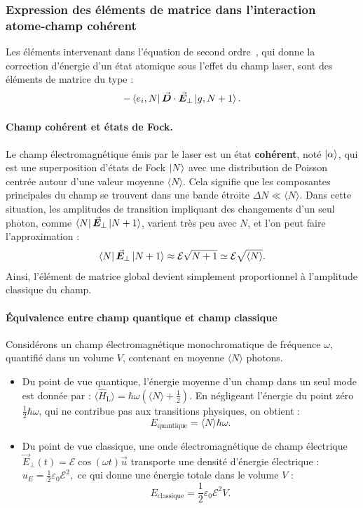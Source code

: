 \subsubsection*{Expression des éléments de matrice dans l’interaction atome-champ cohérent}

Les éléments intervenant dans l’équation de second ordre~, qui donne la correction d’énergie d’un état atomique sous l’effet du champ laser, sont des éléments de matrice du type :
\[
-\bra{e_i, N} \vec{{\bm{D}}} \cdot \vec{{\bm{E}}}_\perp \ket{g, N + 1}.
\]


\paragraph{Champ cohérent et états de Fock.} Le champ électromagnétique émis par le laser est un état \textbf{cohérent}, noté \( \ket{\alpha} \), qui est une superposition d’états de Fock \( \ket{N} \) avec une distribution de Poisson centrée autour d’une valeur moyenne \( \langle N \rangle \). Cela signifie que les composantes principales du champ se trouvent dans une bande étroite \( \Delta N \ll \langle N \rangle \). Dans cette situation, les amplitudes de transition impliquant des changements d’un seul photon, comme \( \bra{N} \vec{{\bm{E}}}_\perp \ket{N+1} \), varient très peu avec \( N \), et l’on peut faire l’approximation :
\[
\bra{N} \vec{{\bm{E}}}_\perp \ket{N+1} \approx \mathcal{E} \sqrt{N+1} \simeq \mathcal{E} \sqrt{\langle N \rangle}.
\]
Ainsi, l’élément de matrice global devient simplement proportionnel à l’amplitude classique du champ.

\paragraph{Équivalence entre champ quantique et champ classique}

Considérons un champ électromagnétique monochromatique de fréquence \( \omega \), quantifié dans un volume \( V \), contenant en moyenne \( \langle N \rangle \) photons.

\begin{itemize}[label = $\bullet$]
  \item Du point de vue quantique, l’énergie moyenne d’un champ dans un seul mode est donnée par :
  \(
  \langle \hat{H}_{\mathrm{L}} \rangle = \hbar \omega \left( \langle N \rangle + \frac{1}{2} \right).
  \)
  En négligeant l’énergie du point zéro \( \frac{1}{2} \hbar \omega \), qui ne contribue pas aux transitions physiques, on obtient :
  \[
  E_{\mathrm{quantique}} = \langle N \rangle \hbar \omega.
  \]

  \item Du point de vue classique, une onde électromagnétique de champ électrique \( \vec{E}_\perp(t) = \mathcal{E} \cos(\omega t) \vec{u} \) transporte une densité d’énergie électrique :
  \(
  u_E = \frac{1}{2} \varepsilon_0\mathcal{E}^2,
  \)
  ce qui donne une énergie totale dans le volume \( V \) :
  \[
  E_{\mathrm{classique}} = \frac{1}{2} \varepsilon_0 \mathcal{E}^2 V.
  \]
\end{itemize}

